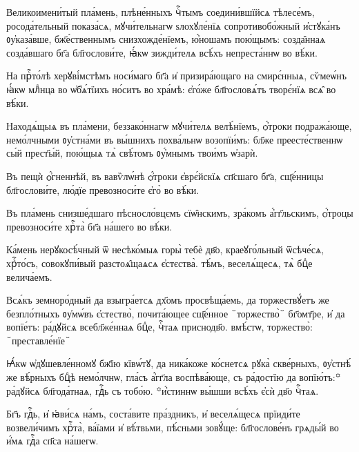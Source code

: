 \hKv Великоимени́тый пла́мень, плѣне́нныхъ чⷭ҇тымъ  соедини́вшїйсѧ тѣлесе́мъ, росода́тельный показа́сѧ,  мꙋчи́тельнагѡ ѕлохꙋле́нїѧ сопротивобо́жный и҆стꙋка́нъ  ᲂу҆каза́вше, бж҃е́ственнымъ снизхожде́нїемъ, ю҆́ношамъ  пою́щымъ: созда̑ннаѧ созда́вшаго бг҃а бл҃гослови́те, ꙗ҆́кѡ  зижди́телѧ всѣ́хъ непреста́ннѡ во вѣ́ки. 

\hKv На прⷭ҇то́лѣ херꙋві́мстѣмъ носи́маго бг҃а и҆ призира́ющаго  на смирє́нныѧ, сѷмеѡ́нъ ꙗ҆́кѡ млⷣнца во ѡ҆б̾ѧ́тїихъ  но́ситъ во хра́мѣ: є҆го́же бл҃гословѧ́тъ творє́нїѧ всѧ̑  во вѣ́ки. 

\hKv Находѧ́щыѧ въ пла́мени, беззако́ннагѡ мꙋчи́телѧ велѣ́нїемъ,  ѻ҆́троки подража́юще, немо́лчными ᲂу҆стна́ми въ вы́шнихъ  похва́льнѡ  возопїи́мъ: бл҃же  преесте́ственнѡ сы́й прест҃ы́й, пою́щыѧ тѧ̀ свѣ́томъ  ᲂу҆́мнымъ твои́мъ ѡ҆зарѝ. 

\hKv Въ пещѝ ѻ҆́гненнѣй, въ вавѷлѡ́нѣ ѻ҆́троки  є҆врє́йскїѧ сп҃сшаго бг҃а, сщ҃е́нницы бл҃гослови́те,  лю́дїе превозноси́те є҆го̀ во вѣ́ки. 

\hKv Въ пла́мень снизше́дшаго пѣсносло́вцємъ сїѡ̑нскимъ,  зра́комъ а҆́гг҃льскимъ, ѻ҆́троцы превозноси́те хрⷭ҇та̀ бг҃а  на́шего во вѣ́ки. 
%

\hKv Ка́мень нерꙋкосѣ́чный ѿ несѣко́мыѧ горы̀ тебѐ дв҃о,  краеꙋго́льный ѿсѣче́сѧ, хрⷭ҇то́съ, совокꙋпи́вый  разстоѧ̑щаѧсѧ є҆стєства̀. тѣ́мъ, веселѧ́щесѧ, тѧ̀ бцⷣе  велича́емъ. 
%

\hKv Всѧ́къ земноро́дный да  взыгра́етсѧ дх҃омъ просвѣща́емь, да торжествꙋ́етъ же  безпло́тныхъ ᲂу҆мѡ́въ є҆стество̀, почита́ющее сщ҃е́нное ꙾торжество̀꙾ бг҃омт҃ре, и҆  да вопїе́тъ: ра́дꙋйсѧ всебл҃же́ннаѧ бцⷣе, чⷭ҇таѧ  приснодв҃о.
 вмѣ́стѡ, торжество̀:  ꙾преставле́нїе꙾
%

\hKv Ꙗ҆́кѡ ѡ҆дꙋшевле́нномꙋ бж҃їю кївѡ́тꙋ, да  ника́коже ко́снетсѧ рꙋка̀ скве́рныхъ, ᲂу҆стнѣ́ же  вѣ́рныхъ бцⷣѣ немо́лчнѡ, гла́съ а҆́гг҃ла воспѣва́юще, съ  ра́достїю да вопїю́тъ:꙳ ра́дꙋйсѧ бл҃года́тнаѧ, гдⷭ҇ь съ  тобо́ю.
\nobreak
{}
\nobreak
꙳и҆́стиннѡ  вы́шши всѣ́хъ є҆сѝ дв҃о чⷭ҇таѧ. 


\hKv Бг҃ъ гдⷭ҇ь, и҆ ꙗ҆ви́сѧ на́мъ,  соста́вите пра́здникъ, и҆ веселѧ́щесѧ прїиди́те возвели́чимъ  хрⷭ҇та̀, ва́їами и҆ вѣ́твьми, пѣ́сньми зовꙋ́ще:  бл҃гослове́нъ грѧды́й во и҆́мѧ гдⷭ҇а сп҃са на́шегѡ. 
%


